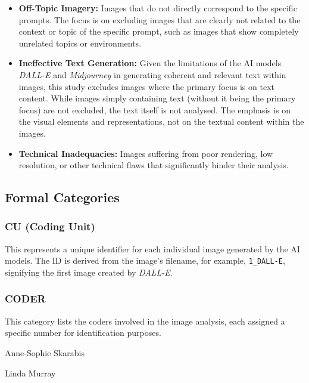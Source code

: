 \begin{itemize}
    \item \textbf{Off-Topic Imagery:} Images that do not directly correspond to the specific prompts. The focus is on excluding images that are clearly not related to the context or topic of the specific prompt, such as images that show completely unrelated topics or environments.
    \item \textbf{Ineffective Text Generation:} Given the limitations of the AI models \textit{DALL-E} and \textit{Midjourney} in generating coherent and relevant text within images, this study excludes images where the primary focus is on text content. While images simply containing text (without it being the primary focus) are not excluded, the text itself is not analysed. The emphasis is on the visual elements and representations, not on the textual content within the images.
    \item \textbf{Technical Inadequacies:} Images suffering from poor rendering, low resolution, or other technical flaws that significantly hinder their analysis.
\end{itemize}


\subsection{Formal Categories}
 \subsubsection*{CU (Coding Unit)} 

 This represents a unique identifier for each individual image generated by the AI models. The ID is derived from the image's filename, for example, \texttt{1\_DALL-E}, signifying the first image created by \textit{DALL-E}.
 
 \subsubsection*{CODER} 

 This category lists the coders involved in the image analysis, each assigned a specific number for identification purposes.
\begin{description}[leftmargin=2.5cm, style=multiline, labelwidth=1.5cm]
\item[1] Anne-Sophie Skarabis
\item[2] Linda Murray
\end{description}

